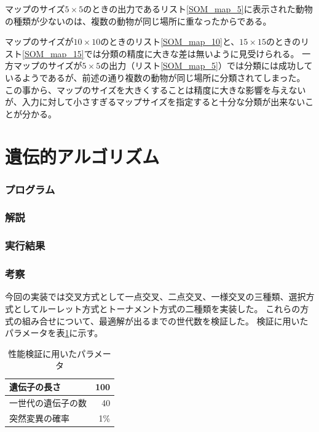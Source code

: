 \documentclass{jsarticle}
\begin{document}




マップのサイズ$5\times5$のときの出力であるリスト\ref{SOM_map_5}に表示された動物の種類が少ないのは、複数の動物が同じ場所に重なったからである。

マップのサイズが$10\times10$のときのリスト\ref{SOM_map_10}と、$15\times15$のときのリスト\ref{SOM_map_15}では分類の精度に大きな差は無いように見受けられる。
一方マップのサイズが$5\times5$の出力（リスト\ref{SOM_map_5}）では分類には成功しているようであるが、前述の通り複数の動物が同じ場所に分類されてしまった。
この事から、マップのサイズを大きくすることは精度に大きな影響を与えないが、入力に対して小さすぎるマップサイズを指定すると十分な分類が出来ないことが分かる。


\part{遺伝的アルゴリズム}
\section{プログラム}


\section{解説}


\section{実行結果}


\section{考察}
今回の実装では交叉方式として一点交叉、二点交叉、一様交叉の三種類、選択方式としてルーレット方式とトーナメント方式の二種類を実装した。
これらの方式の組み合せについて、最適解が出るまでの世代数を検証した。
検証に用いたパラメータを表\ref{GA_params}に示す。

\begin{table}[H]
	\caption{性能検証に用いたパラメータ\label{GA_params}}
	\begin{center}
		\begin{tabular}{|l|r|} \hline
			遺伝子の長さ & 100 \\ \hline
			一世代の遺伝子の数 & 40 \\ \hline
			突然変異の確率 & 1\% \\ \hline
		\end{tabular}
	\end{center}
\end{table}
\end{document}
